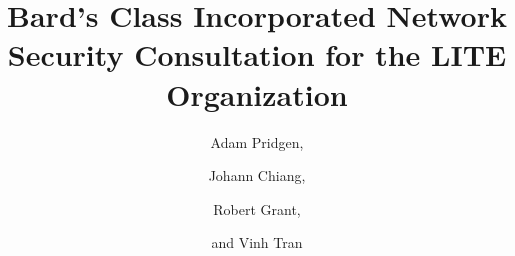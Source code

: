 \documentclass[
	final,
	titlepage,
	narroweqnarray,
	12pt
	]{ieee}
\begin{document}
\title[BCI: Network Security Consultation Report]{%
	Bard's Class Incorporated Network Security Consultation for the LITE Organization}


\author[Bard's Class, Inc.]{%
        Adam Pridgen, 
\and{} Johann Chiang,
\and{} Robert Grant,
\and{}and Vinh Tran
}



\maketitle               

\tableofcontents
\newpage


\end{document}
